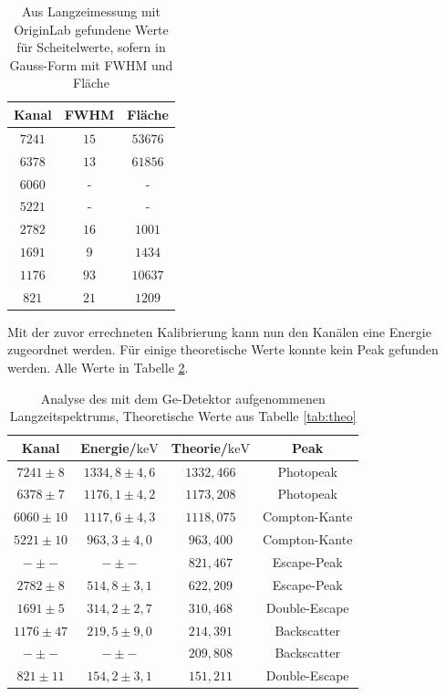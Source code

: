 \documentclass[
	parskip=half,10pt,
	numbers= noenddot, %
	toc=flat, %
	oneside,
	twocolumn,
	]{scrartcl}
\begin{document}
\begin{table}
\centering
\begin{tabular}{ccc}
Kanal & FWHM & Fläche \\
\hline
$7241$ & $15$ & $53676$ \\
$6378$ & $13$ & $61856$ \\
$6060$ & - & - \\
$5221$ & - & - \\
$2782$ & $16$ & $1001$ \\
$1691$ & $9$  & $1434$ \\
$1176$ & $93$ & $10637$ \\
$ 821$ & $21$ & $1209$ 
\end{tabular}
\caption{Aus Langzeimessung mit OriginLab gefundene Werte für Scheitelwerte, sofern in Gauss-Form mit FWHM und Fläche}
\label{tab:fits}
\end{table}

Mit der zuvor errechneten Kalibrierung kann nun den Kanälen eine Energie zugeordnet werden. Für einige theoretische Werte konnte kein Peak gefunden werden. 
Alle Werte in Tabelle \ref{tab:ergebnis}. 

\begin{table}[t]
\centering
\begin{tabular}{cccc}
Kanal & Energie/$\si{\kilo \electronvolt}$ & Theorie/$\si{\kilo \electronvolt}$ & Peak \\
\hline 
$7241 \pm 8$ & $1334,8 \pm 4,6 $ &$1332,466$ &Photopeak \\
$6378 \pm 7$ & $1176,1 \pm 4,2 $ &$1173,208$ &Photopeak\\
$6060 \pm10$ & $1117,6 \pm 4,3 $ &$1118,075$ &Compton-Kante\\
$5221 \pm10$ & $ 963,3 \pm 4,0 $ &$ 963,400$ &Compton-Kante\\
$  -  \pm -$ & $  -    \pm -   $ &$ 821,467$ &Escape-Peak\\
$2782 \pm 8$ & $ 514,8 \pm 3,1 $ &$ 622,209$ &Escape-Peak\\
$1691 \pm 5$ & $ 314,2 \pm 2,7 $ &$ 310,468$ &Double-Escape\\
$1176 \pm47$ & $ 219,5 \pm 9,0 $ &$ 214,391$ &Backscatter\\
$  -  \pm -$ & $  -    \pm -   $ &$ 209,808$ &Backscatter\\
$ 821 \pm11$ & $ 154,2 \pm 3,1 $ &$ 151,211$ &Double-Escape
\end{tabular}
\caption{Analyse des mit dem Ge-Detektor aufgenommenen Langzeitspektrums, Theoretische Werte aus Tabelle \ref{tab:theo}}
\label{tab:ergebnis}
\end{table}
\end{document}
